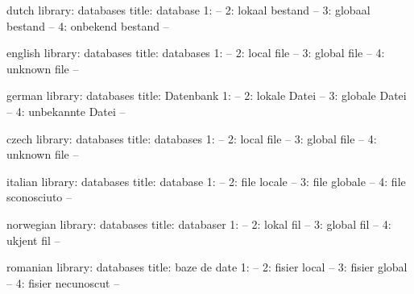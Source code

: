 


\startmessages  dutch  library: databases
  title: database
      1: --
      2: lokaal bestand --
      3: globaal bestand --
      4: onbekend bestand --
\stopmessages

\startmessages  english  library: databases
  title: databases
      1: --
      2: local file --
      3: global file --
      4: unknown file --
\stopmessages

\startmessages  german  library: databases
  title: Datenbank
      1: --
      2: lokale Datei --
      3: globale Datei --
      4: unbekannte Datei --
\stopmessages


\startmessages  czech library: databases
  title: databases
      1: --
      2: local file --
      3: global file --
      4: unknown file --
\stopmessages

\startmessages  italian  library: databases
  title: database
      1: --
      2: file locale --
      3: file globale --
      4: file sconosciuto --
\stopmessages

\startmessages  norwegian  library: databases
  title: databaser
      1: --
      2: lokal fil --
      3: global fil --
      4: ukjent fil --
\stopmessages

\startmessages  romanian  library: databases
  title: baze de date
      1: --
      2: fisier local --
      3: fisier global --
      4: fisier necunoscut --
\stopmessages

\unprotect

